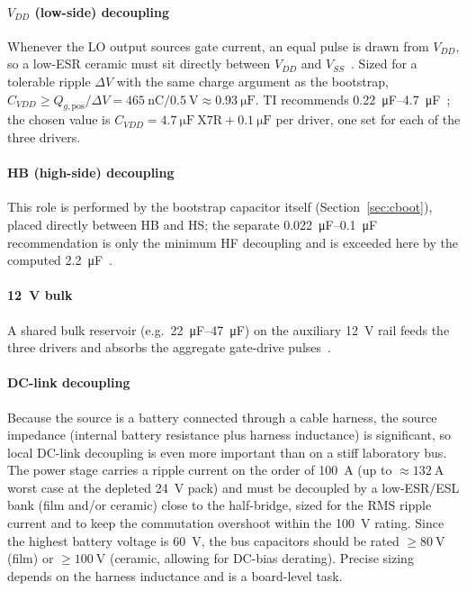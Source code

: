 \documentclass[journal,onecolumn,11pt]{IEEEtran}
\begin{document}
\paragraph{$V_{DD}$ (low-side) decoupling}
Whenever the LO output sources gate current, an equal pulse is drawn from $V_{DD}$, so a low-ESR
ceramic must sit directly between $V_{DD}$ and $V_{SS}$~\cite{ucc27211}. Sized for a tolerable ripple
$\Delta V$ with the same charge argument as the bootstrap,
$C_{VDD}\ge Q_{g,\mathrm{pos}}/\Delta V=\SI{465}{\nano\coulomb}/\SI{0.5}{\volt}\approx\SI{0.93}{\micro\farad}$.
TI recommends \SIrange{0.22}{4.7}{\micro\farad}~\cite{ucc27211}; the chosen value is
$\boxed{C_{VDD}=\SI{4.7}{\micro\farad}\ \text{X7R}+\SI{0.1}{\micro\farad}}$ per driver, one set for
each of the three drivers.

\paragraph{HB (high-side) decoupling}
This role is performed by the bootstrap capacitor itself (Section~\ref{sec:cboot}), placed directly
between HB and HS; the separate \SIrange{0.022}{0.1}{\micro\farad} recommendation is only the minimum
HF decoupling and is exceeded here by the computed \SI{2.2}{\micro\farad}~\cite{ucc27211}.

\paragraph{\SI{12}{\volt} bulk}
A shared bulk reservoir (e.g.\ \SIrange{22}{47}{\micro\farad}) on the auxiliary \SI{12}{\volt} rail
feeds the three drivers and absorbs the aggregate gate-drive pulses~\cite{ucc27211}.

\paragraph{DC-link decoupling}
Because the source is a battery connected through a cable harness, the source impedance (internal
battery resistance plus harness inductance) is significant, so local DC-link decoupling is even more
important than on a stiff laboratory bus. The power stage carries a ripple current on the order of
\SI{100}{\ampere} (up to $\approx\SI{132}{\ampere}$ worst case at the depleted \SI{24}{\volt} pack)
and must be decoupled by a low-ESR/ESL bank (film and/or ceramic) close to the half-bridge, sized
for the RMS ripple current and to keep the commutation overshoot within the \SI{100}{\volt} rating.
Since the highest battery voltage is \SI{60}{\volt}, the bus capacitors should be rated
$\ge\SI{80}{\volt}$ (film) or $\ge\SI{100}{\volt}$ (ceramic, allowing for DC-bias derating). Precise
sizing depends on the harness inductance and is a board-level task.
\end{document}
